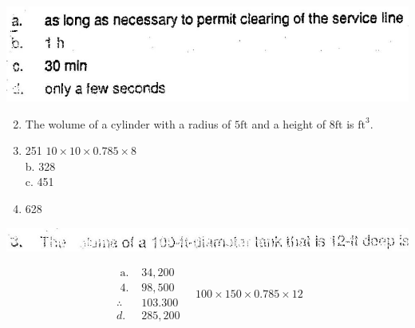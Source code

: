 \documentclass[10pt]{article}
\begin{document}
\includegraphics[max width=\textwidth]{2022_11_11_ca6a6c1a0324ee23e523g-17(1)}

\begin{enumerate}
  \setcounter{enumi}{1}
  \item The wolume of a cylinder with a radius of $5 \mathrm{ft}$ and a height of $8 \mathrm{ft}$ is $\mathrm{ft}^{3}$.
  \item 251 $10 \times 10 \times 0.785 \times 8$\\
b. 328\\
c. 451
  \item 628
\end{enumerate}

\includegraphics[max width=\textwidth]{2022_11_11_ca6a6c1a0324ee23e523g-17(2)}

$$
\begin{array}{ll}
\text { a. } & 34,200 \\
\text { 4. } & 98,500 \\
\therefore & 103.300 \\
d . & 285,200
\end{array} \quad 100 \times 150 \times 0.785 \times 12
$$
\end{document}
